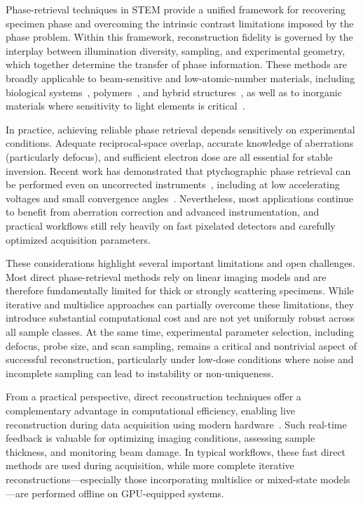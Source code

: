 \documentclass[pdflatex,sn-aps,iicol]{sn-jnl}%
\begin{document}
Phase-retrieval techniques in STEM provide a unified framework for recovering specimen phase and overcoming the intrinsic contrast limitations imposed by the phase problem.
Within this framework, reconstruction fidelity is governed by the interplay between illumination diversity, sampling, and experimental geometry, which together determine the transfer of phase information.
These methods are broadly applicable to beam-sensitive and low-atomic-number materials, including biological systems~\cite{Berk_2024,Yu_2025,Spoth_2017}, polymers~\cite{bardot2025mechanically}, and hybrid structures~\cite{Li_2025,Ma_2025,shen2020imaging,ding2022three}, as well as to inorganic materials where sensitivity to light elements is critical~\cite{lozano2018low,kp2025electron}.

In practice, achieving reliable phase retrieval depends sensitively on experimental conditions.
Adequate reciprocal-space overlap, accurate knowledge of aberrations (particularly defocus), and sufficient electron dose are all essential for stable inversion.
Recent work has demonstrated that ptychographic phase retrieval can be performed even on uncorrected instruments~\cite{nguyen2024achieving}, including at low accelerating voltages and small convergence angles~\cite{blackburn2025sub}.
Nevertheless, most applications continue to benefit from aberration correction and advanced instrumentation, and practical workflows still rely heavily on fast pixelated detectors and carefully optimized acquisition parameters.

These considerations highlight several important limitations and open challenges.
Most direct phase-retrieval methods rely on linear imaging models and are therefore fundamentally limited for thick or strongly scattering specimens.
While iterative and multislice approaches can partially overcome these limitations, they introduce substantial computational cost and are not yet uniformly robust across all sample classes.
At the same time, experimental parameter selection, including defocus, probe size, and scan sampling, remains a critical and nontrivial aspect of successful reconstruction, particularly under low-dose conditions where noise and incomplete sampling can lead to instability or non-uniqueness.

From a practical perspective, direct reconstruction techniques offer a complementary advantage in computational efficiency, enabling live reconstruction during data acquisition using modern hardware~\cite{Yu_2022,Ooe_2021,Pelz_2022,Strauch_2021}.
Such real-time feedback is valuable for optimizing imaging conditions, assessing sample thickness, and monitoring beam damage.
In typical workflows, these fast direct methods are used during acquisition, while more complete iterative reconstructions—especially those incorporating multislice or mixed-state models—are performed offline on GPU-equipped systems.
\end{document}
